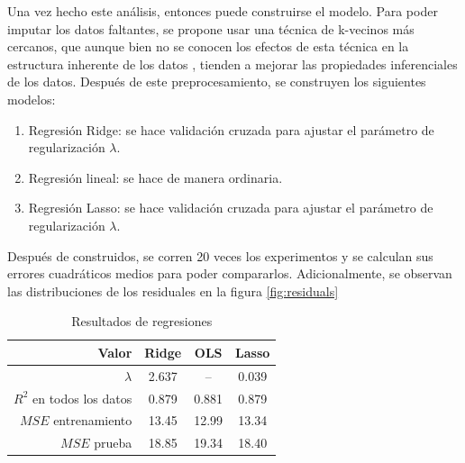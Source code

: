 \documentclass[a4paper,12pt]{amsart}
\begin{document}
    Una vez hecho este análisis, entonces puede construirse el modelo. Para poder 
    imputar los datos faltantes, se propone usar una técnica de k-vecinos más cercanos,
    que aunque bien no se conocen los efectos de esta técnica en la estructura 
    inherente de los datos \cite{beretta_nearest_2016}, tienden a mejorar las 
    propiedades inferenciales de los datos. Después de este preprocesamiento, 
    se construyen los siguientes modelos:

    \begin{enumerate}
        \item Regresión Ridge: se hace validación cruzada para ajustar el parámetro de regularización $\lambda$.
        \item Regresión lineal: se hace de manera ordinaria. 
        \item Regresión Lasso: se hace validación cruzada para ajustar el parámetro de regularización $\lambda$.
    \end{enumerate}

    Después de construidos, se corren 20 veces los experimentos y se calculan 
    sus errores cuadráticos medios para poder compararlos. Adicionalmente, se 
    observan las distribuciones de los residuales en la figura \ref{fig:residuals}

    \begin{table}[h!]
        \centering
        \caption{Resultados de regresiones}
        \begin{tabular}{r c c c}
            \hline
            Valor & Ridge & OLS & Lasso \\
            \hline \hline
            
            $\lambda$ & 2.637 & – & 0.039 \\
            \hline 
            $R^2$ en todos los datos & 0.879 & 0.881 & 0.879 \\
            \hline
            $MSE$ entrenamiento & 13.45 & 12.99 & 13.34 \\
            \hline
            $MSE$ prueba & 18.85 & 19.34 & 18.40 \\
            \hline
        \end{tabular}
    \end{table}
\end{document}
